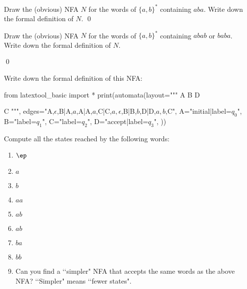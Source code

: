 \newpage
\begin{ex}
Draw the (obvious) NFA $N$ for the words of $\{a,b\}^*$ containing $aba$.
Write down the formal definition of $N$.
\qed
\end{ex}

\newpage
\begin{ex}
Draw the (obvious) NFA $N$ for the words of $\{a,b\}^*$ containing $abab$
or $baba$.
Write down the formal definition of $N$.
\end{ex}
\qed

\newpage
\begin{ex}
  Write down the formal definition of this NFA:
\begin{python}
from latextool_basic import *
print(automata(layout="""
A   B   D

    C
""",
edges="A,$\epsilon$,B|A,$a$,A|A,$a$,C|C,$a,\epsilon$,B|B,$b$,D|D,$a,b$,C",
A="initial|label=$q_0$",
B="label=$q_1$",
C="label=$q_2$",
D="accept|label=$q_3$",
))
\end{python}
Compute all the states reached by the following words:
\begin{enumerate}[label=(\alph*)]
\item $\ep$
\item $a$
\item $b$
\item $aa$
\item $ab$
\item $ab$
\item $ba$
\item $bb$
\item Can you find a \lq\lq simpler" NFA that accepts the same words as the above NFA?
  \lq\lq Simpler" means \lq\lq fewer states".
\end{enumerate}
\end{ex}


